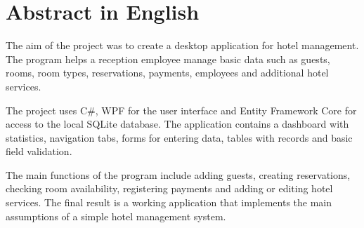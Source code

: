 \chapter*{Abstract in English}

The aim of the project was to create a desktop application for hotel management. The program helps a reception employee manage basic data such as guests, rooms, room types, reservations, payments, employees and additional hotel services.

The project uses C\#, WPF for the user interface and Entity Framework Core for access to the local SQLite database. The application contains a dashboard with statistics, navigation tabs, forms for entering data, tables with records and basic field validation.

The main functions of the program include adding guests, creating reservations, checking room availability, registering payments and adding or editing hotel services. The final result is a working application that implements the main assumptions of a simple hotel management system.
